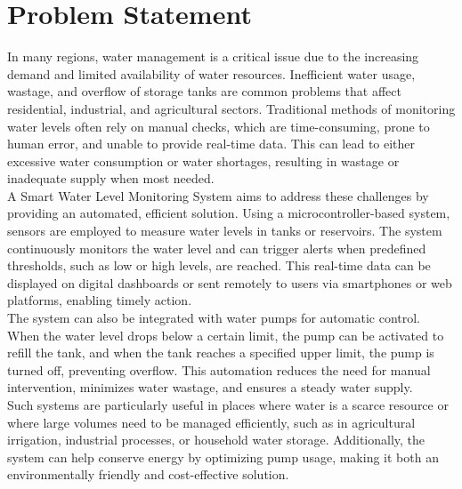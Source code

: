 \section{Problem Statement}
{\fontsize{12}{14}\selectfont
In many regions, water management is a critical issue due to the increasing demand and limited availability of water resources. Inefficient water usage, wastage, and overflow of storage tanks are common problems that affect residential, industrial, and agricultural sectors. Traditional methods of monitoring water levels often rely on manual checks, which are time-consuming, prone to human error, and unable to provide real-time data. This can lead to either excessive water consumption or water shortages, resulting in wastage or inadequate supply when most needed.\\

\noindent
 A Smart Water Level Monitoring System aims to address these challenges by providing an automated, efficient solution. Using a microcontroller-based system, sensors are employed to measure water levels in tanks or reservoirs. The system continuously monitors the water level and can trigger alerts when predefined thresholds, such as low or high levels, are reached. This real-time data can be displayed on digital dashboards or sent remotely to users via smartphones or web platforms, enabling timely action.\\
  
 \noindent
 The system can also be integrated with water pumps for automatic control. When the water level drops below a certain limit, the pump can be activated to refill the tank, and when the tank reaches a specified upper limit, the pump is turned off, preventing overflow. This automation reduces the need for manual intervention, minimizes water wastage, and ensures a steady water supply.\\
 
 \noindent
 Such systems are particularly useful in places where water is a scarce resource or where large volumes need to be managed efficiently, such as in agricultural irrigation, industrial processes, or household water storage. Additionally, the system can help conserve energy by optimizing pump usage, making it both an environmentally friendly and cost-effective solution.
}


